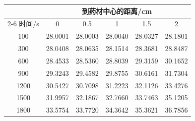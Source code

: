 \begin{tabular}{cccccc}
\toprule
 & \multicolumn{5}{c}{到药材中心的距离/cm} \\
\cmidrule(lr){2-6}
时间/s & 0 & 0.5 & 1 & 1.5 & 2 \\
\midrule
100 & 28.0001 & 28.0003 & 28.0040 & 28.0327 & 28.1801 \\
300 & 28.0408 & 28.0635 & 28.1514 & 28.3681 & 28.8487 \\
600 & 28.4533 & 28.5360 & 28.8039 & 29.3159 & 30.1652 \\
900 & 29.3243 & 29.4582 & 29.8755 & 30.6161 & 31.7304 \\
1200 & 30.5427 & 30.7098 & 31.2223 & 32.1126 & 33.4276 \\
1500 & 31.9957 & 32.1867 & 32.7660 & 33.7463 & 35.1205 \\
1800 & 33.5754 & 33.7720 & 34.3642 & 35.3621 & 36.7856 \\
\bottomrule
\end{tabular}
